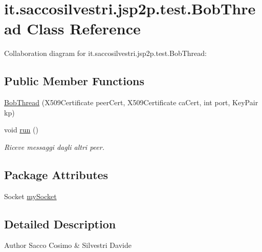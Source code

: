 \hypertarget{classit_1_1saccosilvestri_1_1jsp2p_1_1test_1_1_bob_thread}{
\section{it.saccosilvestri.jsp2p.test.\-Bob\-Thread \-Class \-Reference}
\label{classit_1_1saccosilvestri_1_1jsp2p_1_1test_1_1_bob_thread}
}


\-Collaboration diagram for it.saccosilvestri.jsp2p.test.\-Bob\-Thread\-:
\subsection*{\-Public \-Member \-Functions}
\begin{DoxyCompactItemize}
\item 
\hyperlink{classit_1_1saccosilvestri_1_1jsp2p_1_1test_1_1_bob_thread_aeed59d278050c332dcc442a3819b1342}{\-Bob\-Thread} (\-X509\-Certificate peer\-Cert, \-X509\-Certificate ca\-Cert, int port, \-Key\-Pair kp)
\item 
void \hyperlink{classit_1_1saccosilvestri_1_1jsp2p_1_1test_1_1_bob_thread_ae9866d921fa3d15081060df6c9e873e9}{run} ()
\begin{DoxyCompactList}\small\item\em \-Riceve messaggi dagli altri peer. \end{DoxyCompactList}\end{DoxyCompactItemize}
\subsection*{\-Package \-Attributes}
\begin{DoxyCompactItemize}
\item 
\-Socket \hyperlink{classit_1_1saccosilvestri_1_1jsp2p_1_1test_1_1_bob_thread_ad788d045c926c3c835dbadc54e3d0c12}{my\-Socket}
\end{DoxyCompactItemize}


\subsection{\-Detailed \-Description}
\begin{DoxyAuthor}{\-Author}
\-Sacco \-Cosimo \& \-Silvestri \-Davide 
\end{DoxyAuthor}


